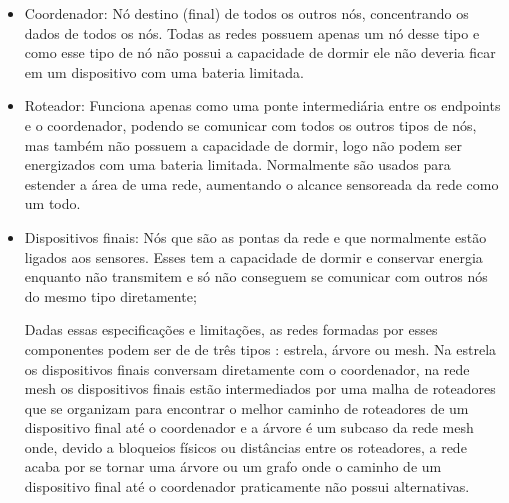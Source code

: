  \begin{itemize}
\item{Coordenador}: Nó destino (final) de todos os outros nós, concentrando os dados de todos os nós. Todas as redes possuem apenas um nó desse tipo e como esse tipo de nó não possui a capacidade de dormir ele não deveria ficar em um dispositivo com uma bateria limitada.
\item{Roteador}: Funciona apenas como uma ponte intermediária entre os endpoints e o coordenador, podendo se comunicar com todos os outros tipos de nós, mas também não possuem a capacidade de dormir, logo não podem ser energizados com uma bateria limitada. Normalmente são usados para estender a área de uma rede, aumentando o alcance sensoreada da rede como um todo.
\item{Dispositivos finais}: Nós que são as pontas da rede e que normalmente estão ligados aos sensores. Esses tem a capacidade de dormir e conservar energia enquanto não transmitem e só não conseguem se comunicar com outros nós do mesmo tipo diretamente;

Dadas essas especificações e limitações, as redes formadas por esses componentes podem ser de de três tipos \cite{xbee_book}: estrela, árvore ou mesh. Na estrela os dispositivos finais conversam diretamente com o coordenador, na rede mesh os dispositivos finais estão intermediados por uma malha de roteadores que se organizam para encontrar o melhor caminho de roteadores de um dispositivo final até o coordenador e a árvore é um subcaso da rede mesh onde, devido a bloqueios físicos ou distâncias entre os roteadores, a rede acaba por se tornar uma árvore ou um grafo onde o caminho de um dispositivo final até o coordenador praticamente não possui alternativas.

\end{itemize}

